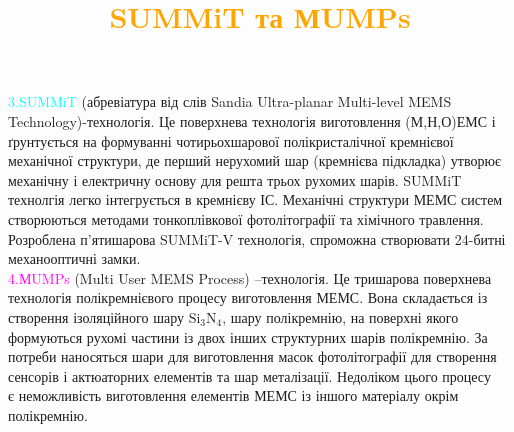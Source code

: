 \documentclass[aspectratio=169]{beamer}
\begin{document}
{
\title{\textcolor{orange}{SUMMiT та МUMPs}}
\begin{frame}
\begin{flushleft}
\textcolor{cyan}{\textbf\large 3.SUMMiT} 
	(абревіатура від слів Sandia Ultra-planar Multi-level MEMS Technology)-технологія. Це поверхнева технологія виготовлення (М,Н,О)ЕМС і ґрунтується на формуванні чотирьохшарової 	полікристалічної кремнієвої механічної структури, де перший нерухомий шар (кремнієва підкладка) утворює механічну і електричну основу для решта трьох рухомих шарів. SUMMiT 	технолгія легко інтегрується в кремнієву ІС. Механічні структури МЕМС систем створюються методами тонкоплівкової фотолітографії та хімічного травлення. Розроблена 			п’ятишарова SUMMiT-V технологія, спроможна створювати 24-битні механооптичні замки.\\
\textcolor{magenta}{\textbf\large4.МUMPs} 
	(Multi User MEMS Process) –технологія. Це тришарова поверхнева технологія полікремнієвого процесу виготовлення МЕМС. Вона складається із створення ізоляційного шару
	 $\mathrm{Si_3 N_4}$, шару полікремнію, на
	поверхні якого формуються рухомі частини із двох інших структурних шарів полікремнію. За потреби наносяться шари для виготовлення масок фотолітографії для створення 		сенсорів і актюаторних елементів та шар металізації. Недоліком цього процесу\\ є неможливість виготовлення елементів МЕМС із іншого матеріалу окрім полікремнію.
\end{flushleft}
\end{frame}
}



{
\title{\textcolor{red}{}}
\begin{frame}
\end{frame}
}
\end{document}
